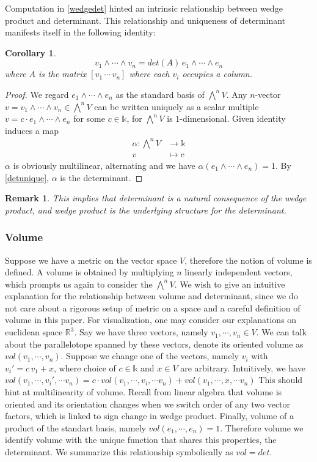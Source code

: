 \documentclass[12pt]{article}
\newtheorem{corollary}[theorem]{Corollary}
\newtheorem{remark}[theorem]{Remark}
\numberwithin{theorem}{section}
\numberwithin{equation}{theorem}
\newcommand{\kk}{\mathds{k}}
\begin{document}
Computation in \ref{wedgedet} hinted an intrinsic relationship between wedge product and determinant. This relationship and uniqueness of determinant manifests itself in the following identity:

\begin{corollary}
    $$v_1 \wedge \cdots \wedge v_n = det(A)\,e_1 \wedge \cdots \wedge e_n$$ where $A$ is the matrix $[v_1 \, \cdots \, v_n]$ where each $v_i$ occupies a column.
\end{corollary}
\begin{proof}
    We regard $e_1 \wedge \cdots \wedge e_n$ as the standard basis of  $\bigwedge^nV$. Any $n$-vector $v = v_1 \wedge \cdots \wedge v_n \in \bigwedge^nV$ can be written uniquely as a scalar multiple $v = c \cdot e_1 \wedge \cdots \wedge e_n$ for some $c \in \kk$, for $\bigwedge^nV$ is $1$-dimensional. Given identity induces a map 
    \begin{align*}
        \alpha : \bigwedge^nV &\to \kk\\
        v &\mapsto c
    \end{align*}
    $\alpha$ is obviously multilinear, alternating and we have $\alpha(e_1 \wedge \cdots \wedge e_n) = 1$. By \ref{detunique}, $\alpha$ is the determinant.
\end{proof}

\begin{remark}
    This implies that determinant is a natural consequence of the wedge product, and wedge product is the underlying structure for the determinant.
\end{remark}

\subsubsection{Volume}
Suppose we have a metric on the vector space $V$, therefore the notion of volume is defined. A volume is obtained by multiplying $n$ linearly independent vectors, which prompts us again to consider the $\bigwedge^nV$. We wish to give an intuitive explanation for the relationship between volume and determinant, since we do not care about a rigorous setup of metric on a space and a careful definition of volume in this paper. For visualization, one may consider our explanations on euclidean space $\mathbb{R}^3$. Say we have three vectors, namely $v_1, \cdots, v_n \in V$. We can talk about the parallelotope spanned by these vectors, denote its oriented volume as $vol(v_1, \cdots, v_n)$. Suppose we change one of the vectors, namely $v_i$ with $v_i' = c\,v_1 + x$, where choice of $c \in \kk$ and $x \in V$ are arbitrary. Intuitively, we have $vol(v_1, \cdots, v_i', \cdots v_n) = c \cdot vol(v_1, \cdots, v_i, \cdots v_n) + vol(v_1, \cdots, x, \cdots v_n)$ This should hint at multilinearity of volume. Recall from linear algebra that volume is oriented and its orientation changes when we switch order of any two vector factors, which is linked to sign change in wedge product. Finally, volume of a product of the standart basis, namely $vol(e_1, \cdots, e_n) = 1$. Therefore volume we identify volume with the unique function that shares this properties, the determinant. We summarize this relationship symbolically as $vol = det$.
\end{document}
